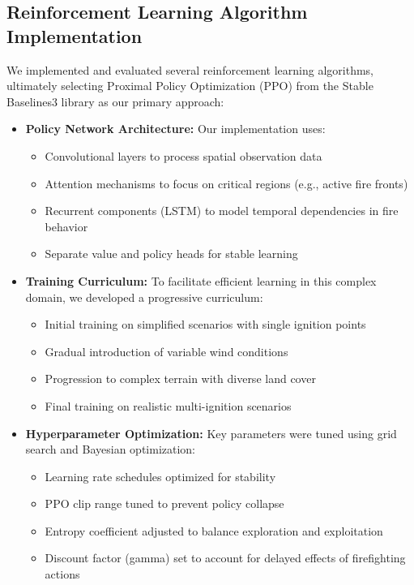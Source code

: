 \documentclass[conference]{IEEEtran}
\begin{document}
\subsection{Reinforcement Learning Algorithm Implementation}

We implemented and evaluated several reinforcement learning algorithms, ultimately selecting Proximal Policy Optimization (PPO) from the Stable Baselines3 library as our primary approach:

\begin{itemize}
    \item \textbf{Policy Network Architecture:} Our implementation uses:
    \begin{itemize}
        \item Convolutional layers to process spatial observation data
        \item Attention mechanisms to focus on critical regions (e.g., active fire fronts)
        \item Recurrent components (LSTM) to model temporal dependencies in fire behavior
        \item Separate value and policy heads for stable learning
    \end{itemize}
    
    \item \textbf{Training Curriculum:} To facilitate efficient learning in this complex domain, we developed a progressive curriculum:
    \begin{itemize}
        \item Initial training on simplified scenarios with single ignition points
        \item Gradual introduction of variable wind conditions
        \item Progression to complex terrain with diverse land cover
        \item Final training on realistic multi-ignition scenarios
    \end{itemize}
    
    \item \textbf{Hyperparameter Optimization:} Key parameters were tuned using grid search and Bayesian optimization:
    \begin{itemize}
        \item Learning rate schedules optimized for stability
        \item PPO clip range tuned to prevent policy collapse
        \item Entropy coefficient adjusted to balance exploration and exploitation
        \item Discount factor (gamma) set to account for delayed effects of firefighting actions
    \end{itemize}
\end{itemize}
\end{document}
